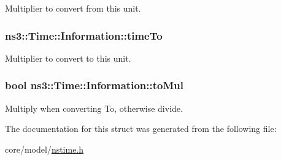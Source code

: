 Multiplier to convert from this unit. 

\subsubsection[{\texorpdfstring{time\+To}{timeTo}}]{ ns3\+::\+Time\+::\+Information\+::time\+To}\hypertarget{structns3_1_1Time_1_1Information_af79a720070ce8c87ed09c5313ad7e41b}{}\label{structns3_1_1Time_1_1Information_af79a720070ce8c87ed09c5313ad7e41b}


Multiplier to convert to this unit. 

\subsubsection[{\texorpdfstring{to\+Mul}{toMul}}]{\setlength{\rightskip}{0pt plus 5cm}bool ns3\+::\+Time\+::\+Information\+::to\+Mul}\hypertarget{structns3_1_1Time_1_1Information_a397ae841edfe126ecc26ffd5fed21742}{}\label{structns3_1_1Time_1_1Information_a397ae841edfe126ecc26ffd5fed21742}


Multiply when converting To, otherwise divide. 



The documentation for this struct was generated from the following file\+:\begin{DoxyCompactItemize}
\item 
core/model/\hyperlink{nstime_8h}{nstime.\+h}\end{DoxyCompactItemize}

